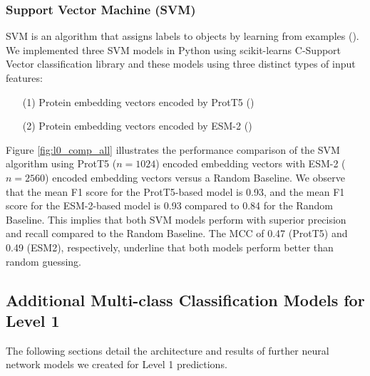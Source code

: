 \documentclass{bioinfo}
\begin{document}


\subsubsection{Support Vector Machine (SVM)}
SVM is an algorithm that assigns labels to objects by learning from examples (\cite{svm}).
We implemented three SVM models in Python using scikit-learns C-Support Vector classification library and these models using three distinct types of 
input features: 
\begin{enumerate}
	\item[(1)] Protein embedding vectors encoded by ProtT5 (\cite{ProtT5})
	\item[(2)] Protein embedding vectors encoded by ESM-2 (\cite{ESM2})
\end{enumerate}

Figure \ref{fig:l0_comp_all} illustrates the performance comparison of the SVM algorithm using ProtT5 ($n=1024$) 
encoded embedding vectors with ESM-2 ($n=2560$) encoded embedding vectors versus a Random Baseline. 
We observe that the mean F1 score for the ProtT5-based model is 0.93, and the mean F1 score for the ESM-2-based model is 0.93 compared to 0.84 for the Random Baseline. This implies that both SVM models perform 
with superior precision and recall compared to the Random Baseline. The MCC of 0.47 (ProtT5) and 0.49 (ESM2),
respectively, underline that both models perform better than random guessing.


\subsection{Additional Multi-class Classification Models for Level 1}
The following sections detail the architecture and results of further neural network models we created for Level 1 predictions.
\end{document}
